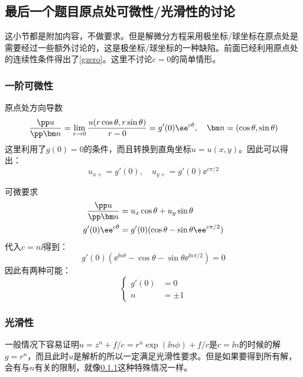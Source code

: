 \documentclass[a4paper,12pt]{ctexart}
\begin{document}
\subsection{最后一个题目原点处可微性/光滑性的讨论}
这小节都是附加内容，不做要求。但是解微分方程采用极坐标/球坐标在原点处是需要经过一些额外讨论的，这是极坐标/球坐标的一种缺陷。前面已经利用原点处的连续性条件得出了\ref{gzero}。这里不讨论$c=0$的简单情形。
\subsubsection{一阶可微性}\label{1st}
原点处方向导数
\begin{equation}
\frac{\pp u}{\pp \bm n}=\lim_{r\to 0} \frac{u(r\cos\theta,r\sin\theta)}{r-0}=g'(0)\ee^{c\theta},\quad \bm n=(\cos\theta,\sin\theta)
\end{equation}
这里利用了$g(0)=0$的条件，而且转换到直角坐标$u=u(x,y)$。因此可以得出：
\begin{equation}
u_{x+}=g'(0), \quad u_{y+}=g'(0)\ee^{c\pi/2}
\end{equation}

可微要求
\begin{align}
 \frac{\pp u}{\pp \bm n}&=u_x\cos\theta +u_y\sin\theta \\
 g'(0)\ee^{c\theta}&=g'(0)(\cos\theta-\sin\theta\ee^{c\pi/2})
\end{align}
代入$c=n\ii$得到：
\begin{equation}
g'(0)(\ee^{\ii n\theta}-\cos\theta-\sin\theta\ee^{\ii n\pi/2})=0
\end{equation}
因此有两种可能：
\begin{equation}
\left\{
\begin{aligned}
 g'(0)&=0\\
 n&=\pm 1
\end{aligned}
\right.
\end{equation}
\subsubsection{光滑性}
一般情况下容易证明$u=z^n+f/c=r^n\exp(\ii n\phi)+f/c$是$c=\ii n$的时候的解$g=r^n$，而且此时$u$是解析的所以一定满足光滑性要求。但是如果要得到所有解，会有与$n$有关的限制，就像\ref{1st}这种特殊情况一样。

\end{document}
